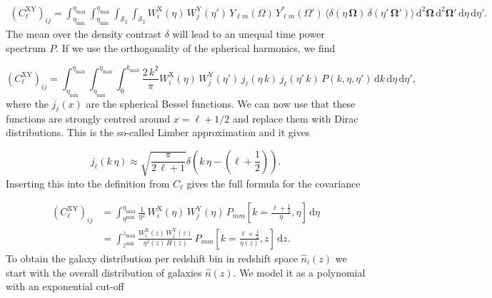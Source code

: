 \documentclass[oneside]{book}
\newcommand*{\rd}{\mathrm{d}}
\begin{document}
\begin{align}
    \label{eq:covariance_notwopoint}
    \left(C^\mathrm{XY}_{\ell}\right)_{ij}= \int_{\eta_\mathrm{min}}^{\eta_\mathrm{max}} \int_{\eta_\mathrm{min}}^{\eta_\mathrm{max}} \int_{\mathcal{S}_2} \int_{\mathcal{S}_2} W_i^\mathrm{X}(\eta)\, W_j^\mathrm{Y}(\eta')\, Y_{\ell m}(\Omega) \, Y^*_{\ell m}(\Omega')\, \langle \delta(\eta\,\boldsymbol{\Omega})\,\delta(\eta'\,\boldsymbol{\Omega}') \rangle\, \rd^2 \boldsymbol{\Omega} \, \rd^2 \boldsymbol{\Omega}' \,\rd \eta\, \rd \eta'.
\end{align}
The mean over the density contrast $\delta$ will lead to an unequal time power spectrum $P$. If we use the orthogonality of the spherical harmonics, we find 

\begin{equation*}
    \left(C^\mathrm{XY}_{\ell}\right)_{ij} = \int_{\eta_\mathrm{min}}^{\eta_\mathrm{max}} \int_{{\eta_\mathrm{min}}}^{\eta_\mathrm{max}} \int_0^{k_\mathrm{max}} \frac{2\,k^2}{\pi} W_i^\mathrm{X}(\eta) \,  W_j^\mathrm{Y}(\eta') \, j_\ell(\eta\,k ) \, j_\ell(\eta' \,k) \, P(k,\eta,\eta') \, \rd k \, \rd \eta \, \rd \eta',
\end{equation*} 
where the $j_\ell(x)$ are the spherical Bessel functions. We can now use that these functions are strongly centred around $x=\ell+1/2$ and replace them with Dirac distributions. This is the so-called Limber approximation and it gives 

\begin{equation}
    j_\ell(k\,\eta) \approx \sqrt{\frac{\pi}{2\,\ell+1}} \delta\left(k\,\eta - (\ell+ \frac{1}{2})\right).
\end{equation}
Inserting this into the definition from $C_{\ell}$ gives the full formula for the covariance 

\begin{align}
    \left(C^\mathrm{XY}_{\ell}\right)_{ij} &= \int_{\eta^\mathrm{min}}^{\eta_\mathrm{max}} \frac{1}{\eta^2}\,W_i^\mathrm{X}(\eta) \,  W_j^\mathrm{Y}(\eta)\,P_{mm}\left[k=\frac{\ell+\frac{1}{2}}{\eta},\eta\right]\, \rd\eta \nonumber \\
    \label{eq:covariance_from_pmm}
    &= \int_{z^\mathrm{min}}^{z_\mathrm{max}} \frac{W_i^\mathrm{X}(z) \,  W_j^\mathrm{Y}(z)}{\eta^2(z)\,H(z)}\,P_{mm}\left[k=\frac{\ell+\frac{1}{2}}{\eta(z)},z\right]\, \rd z.
\end{align}
 To obtain the galaxy distribution per redshift bin in redshift space $\hat{n}_i(z)$ we start with the overall distribution of galaxies $\hat{n}(z)$. We model it as a polynomial with an exponential cut-off
 
\end{document}
